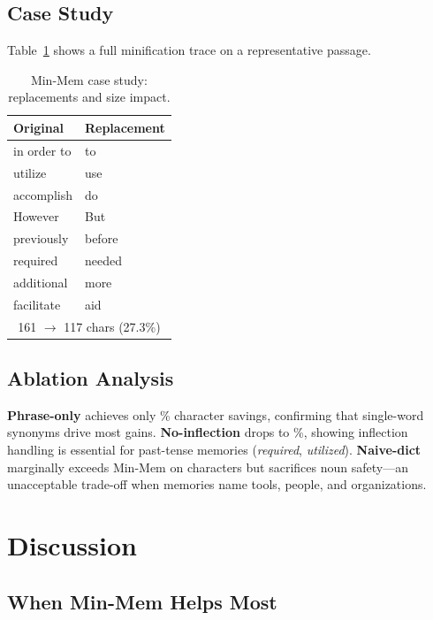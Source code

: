 \documentclass[10pt,twocolumn]{article}
\begin{document}
\subsection{Case Study}

Table~\ref{tab:case} shows a full minification trace on a representative passage.

\begin{table}[t]
    \centering
    \caption{Min-Mem case study: replacements and size impact.}
    \label{tab:case}
    \small
    \begin{tabular}{@{}ll@{}}
        \toprule
        Original & Replacement \\
        \midrule
        in order to & to \\
        utilize & use \\
        accomplish & do \\
        However & But \\
        previously & before \\
        required & needed \\
        additional & more \\
        facilitate & aid \\
        \midrule
        \multicolumn{2}{c}{161 $\rightarrow$ 117 chars (27.3\%)} \\
        \bottomrule
    \end{tabular}
\end{table}

\subsection{Ablation Analysis}

\textbf{Phrase-only} achieves only \PhraseCharSavings\% character savings, confirming that single-word synonyms drive most gains. \textbf{No-inflection} drops to \NoInflCharSavings\%, showing inflection handling is essential for past-tense memories (\emph{required}, \emph{utilized}). \textbf{Naive-dict} marginally exceeds Min-Mem on characters but sacrifices noun safety---an unacceptable trade-off when memories name tools, people, and organizations.

\section{Discussion}

\subsection{When Min-Mem Helps Most}
\end{document}
